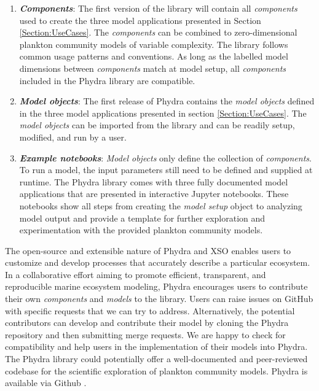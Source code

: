 \documentclass[gmd, manuscript]{copernicus}
\begin{document}
\begin{enumerate}
    \item \textbf{\textit{Components}}: The first version of the library will contain all \textit{components} used to create the three model applications presented in Section \ref{Section:UseCases}. The \textit{components} can be combined to zero-dimensional plankton community models of variable complexity. The library follows common usage patterns and conventions. As long as the labelled model dimensions between \textit{components} match at model setup, all \textit{components} included in the Phydra library are compatible.
    
    \item \textbf{\textit{Model objects}}: The first release of Phydra contains the \textit{model objects} defined in the three model applications presented in section \ref{Section:UseCases}. The \textit{model objects} can be imported from the library and can be readily setup, modified, and run by a user.
    
    \item \textbf{\textit{Example notebooks}}: \textit{Model objects} only define the collection of \textit{components}. To run a model, the input parameters still need to be defined and supplied at runtime. The Phydra library comes with three fully documented model applications that are presented in interactive Jupyter notebooks. These notebooks show all steps from creating the \textit{model setup} object to analyzing model output and provide a template for further exploration and experimentation with the provided plankton community models.
    
\end{enumerate}

The open-source and extensible nature of Phydra and XSO enables users to customize and develop processes that accurately describe a particular ecosystem. In a collaborative effort aiming to promote efficient, transparent, and reproducible marine ecosystem modeling, Phydra encourages users to contribute their own \textit{components} and \textit{models} to the  library. Users can raise issues on GitHub with specific requests that we can try to address. Alternatively, the potential contributors can develop and contribute their model by cloning the Phydra repository and then submitting merge requests. We are happy to check for compatibility and help users in the implementation of their models into Phydra. The Phydra library could potentially offer a well-documented and peer-reviewed codebase for the scientific exploration of plankton community models. Phydra is available via Github \citep{Post2023Phydra}.
\end{document}

